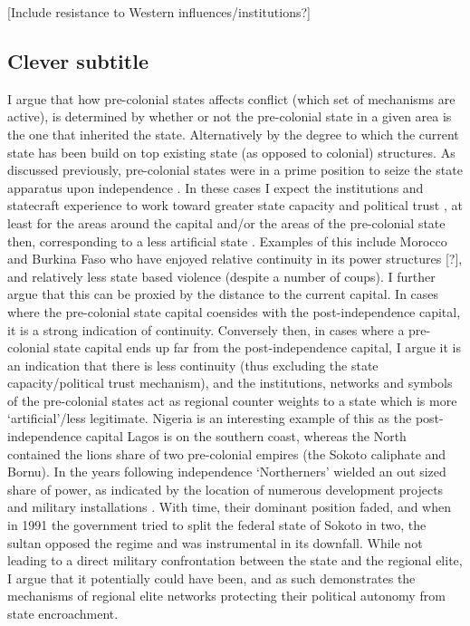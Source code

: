 \documentclass[12pt]{article}
\begin{document}
[Include resistance to Western influences/institutions?]


\subsection{Clever subtitle}

I argue that how pre-colonial states affects conflict (which set of mechanisms
are active), is determined by whether or not the pre-colonial state in a given
area is the one that inherited the state. Alternatively by the degree to which
the current state has been build on top existing state (as opposed to colonial)
structures. As discussed previously, pre-colonial states were in a prime
position to seize the state apparatus upon independence \citep{Paine2019}. In
these cases I expect the institutions and statecraft experience to work toward
greater state capacity and political trust \citep{Depetris-Chauvin2016}, at
least for the areas around the capital and/or the areas of the pre-colonial
state then, corresponding to a less artificial state \citep{Alesina2011}.
Examples of this include Morocco and Burkina Faso who have enjoyed relative
continuity in its power structures [?], and relatively less state based violence
(despite a number of coups). I further argue that this can be proxied by the
distance to the current capital. In cases where the pre-colonial state capital
coensides with the post-independence capital, it is a strong indication of
continuity. 
Conversely then, in cases where a pre-colonial state capital ends up far from
the post-independence capital, I argue it is an indication that there is less
continuity (thus excluding the state capacity/political trust mechanism), and
the institutions, networks and symbols of the pre-colonial states act as 
regional counter weights to a state which is more `artificial'/less legitimate.
Nigeria is an interesting example of this as the post-independence capital Lagos
is on the southern coast, whereas the North contained the lions share of two
pre-colonial empires (the Sokoto caliphate and Bornu). In the years following
independence `Northerners' wielded an out sized share of power, as indicated by
the location of numerous development projects and military installations
\citep{Bates2008a}. With time, their dominant position faded, and when in 1991
the government tried to split the federal state of Sokoto in two, the sultan
opposed the regime and was instrumental in its downfall. While not leading to a
direct military confrontation between the state and the regional elite, I argue
that it potentially could have been, and as such demonstrates the mechanisms of
regional elite networks protecting their political autonomy from state
encroachment.
\end{document}
